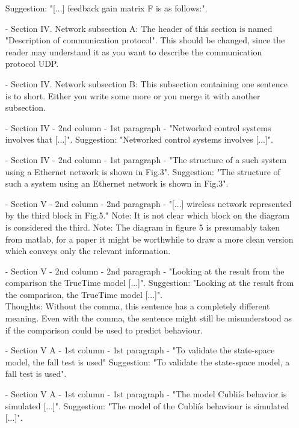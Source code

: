\begin{itemize}
Suggestion: "[...] feedback gain matrix F is as follows:".\\
\item[-]Section IV. Network subsection A: The header of this section is named "Description of communication protocol". This should be changed, since the reader may understand it as you want to describe the communication protocol UDP.\\			\item[-]Section IV. Network subsection B: This subsection containing one sentence is to short. Either you write some more or you merge it with another subsection.\\
\item[-]Section IV - 2nd column - 1st paragraph - "Networked control systems involves that [...]".
Suggestion: "Networked control systems involves [...]".\\
\item[-]Section IV - 2nd column - 1st paragraph - "The structure of a such system using a Ethernet network is shown in Fig.3".
Suggestion: "The structure of such a system using an Ethernet network is shown in Fig.3".\\								\item[-] 
Section V - 2nd column - 2nd paragraph - "[...] wireless network represented by the third block in Fig.5."
Note: It is not clear which block on the diagram is considered the third.
Note: The diagram in figure 5 is presumably taken from matlab, for a paper it might be worthwhile to draw a more clean version which conveys only the relevant information.\\
\item[-]Section V - 2nd column - 2nd paragraph - "Looking at the result from the comparison the TrueTime model [...]".
Suggestion: "Looking at the result from the comparison, the TrueTime model [...]".\\
Thoughts: Without the comma, this sentence has a completely different meaning. Even with the comma, the sentence might still be misunderstood as if the comparison could be used to predict behaviour.	\\
\item[-]Section V A - 1st column - 1st paragraph - "To validate the state-space model, the fall test is used"
Suggestion: "To validate the state-space model, a fall test is used".\\
\item[-]
Section V A - 1st column - 1st paragraph - "The model Cubliís behavior is simulated [...]".
Suggestion: "The model of the Cubliís behaviour is simulated [...]".\\

\end{itemize}
